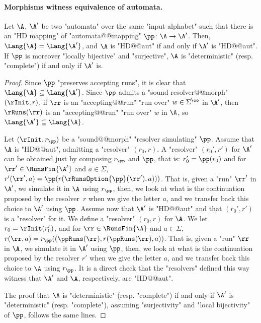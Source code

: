 \documentclass[10pt,a4paper]{amsart}
\renewcommand{\SS}{\Sigma}
\begin{document}
\paragraph*{Morphisms witness equivalence of automata.}
\begin{proposition}\label{prop-morph:HD mappings-preserve-languages}
	Let $\A$, $\A'$ be two "automata" over the same "input alphabet" such that there is an "HD mapping" of "automata@@mapping" $\pp\colon \A \to \A'$. Then, $\Lang{\A}=\Lang{\A'}$, and $\A$ is "HD@@aut" if and only if $\A'$ is "HD@@aut".
	If $\pp$ is moreover "locally bijective" and "surjective", $\A$ is "deterministic" (resp. "complete") if and only if $\A'$ is.
\end{proposition}
\begin{proof}
	Since $\pp$ "preserves accepting runs", it is clear that $\Lang{\A}\subseteq \Lang{\A'}$. Since $\pp$ admits a "sound resolver@@morph" $(\rInit, r)$, if $\rr$ is an "accepting@@run" "run over" $w\in \SS^\oo$ in $\A'$, then $\rRuns(\rr)$ is an "accepting@@run" "run over" $w$ in $\A$, so $\Lang{\A'}\subseteq \Lang{\A}$.
	
	Let $(\rInit, r_\pp)$ be a "sound@@morph" "resolver simulating" $\pp$.
	Assume that $\A$ is "HD@@aut", admitting a "resolver" $(r_0,r)$. A "resolver" $(r_0',r')$ for $\A'$ can be obtained just by composing $r_\pp$ and $\pp$, that is: $r_0' = \pp(r_0)$ and for $\rr'\in \RunsFin{\A'}$ and $a\in \SS$, $r'(\rr', a) = \pp(r(\rRunsOption{\pp}(\rr'),a)))$. That is, given a "run" $\rr'$ in $\A'$, we simulate it in $\A$ using $r_\pp$, then, we look at what is the continuation proposed by the resolver~$r$ when we give the letter $a$, and we transfer back this choice to $\A'$ using $\pp$. 
	Assume now that $\A'$ is "HD@@aut" and that $(r_0',r')$ is a "resolver" for it. We define a "resolver" $(r_0,r)$ for $\A$. We let $r_0 = \rInit(r_0')$, and for $\rr\in \RunsFin{\A}$ and $a\in \SS$, $r(\rr, a) = r_\pp((\ppRuns(\rr), r(\ppRuns(\rr),a))$. That is, given a "run" $\rr$ in $\A$, we simulate it in $\A'$ using $\pp$, then, we look at what is the continuation proposed by the resolver $r'$ when we give the letter $a$, and we transfer back this choice to $\A$ using $r_\pp$. 
	It is a direct check that the "resolvers" defined this way witness that $\A'$ and $\A$, respectively, are "HD@@aut".
	
	 The proof that $\A$ is "deterministic" (resp. "complete") if and only if $\A'$ is "deterministic" (resp. "complete"), assuming "surjectivity" and "local bijectivity" of $\pp$, follows the same lines.
\end{proof}
\end{document}
